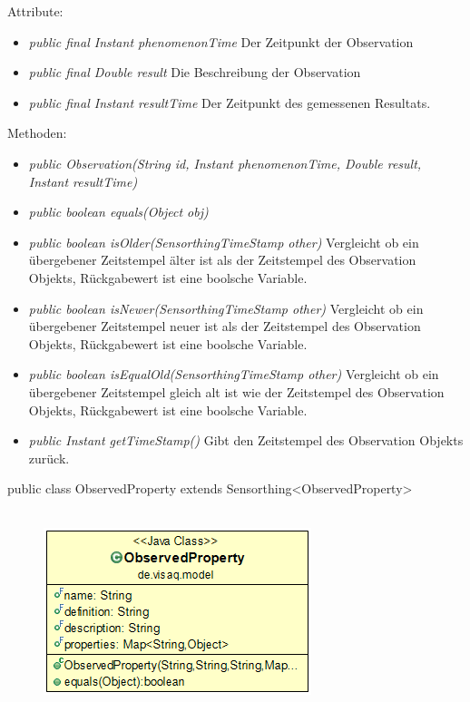 Attribute:
\begin{itemize} 
	\item \emph{public final Instant phenomenonTime} Der Zeitpunkt der Observation
	\item \emph{public final Double result} Die Beschreibung der Observation
	\item \emph{public final Instant resultTime} Der Zeitpunkt des gemessenen Resultats.
\end{itemize}
Methoden:
\begin{itemize} 
	\item \emph{public Observation(String id, Instant phenomenonTime, Double result, Instant resultTime)} 
	\item \emph{public boolean equals(Object obj)} 
	\item \emph{public boolean isOlder(SensorthingTimeStamp other)} Vergleicht ob ein übergebener Zeitstempel älter ist als der Zeitstempel des Observation Objekts, Rückgabewert ist eine boolsche Variable.
	\item \emph{public boolean isNewer(SensorthingTimeStamp other)} Vergleicht ob ein übergebener Zeitstempel neuer ist als der Zeitstempel des Observation Objekts, Rückgabewert ist eine boolsche Variable.
	\item \emph{public boolean isEqualOld(SensorthingTimeStamp other)} Vergleicht ob ein übergebener Zeitstempel gleich alt ist wie der Zeitstempel des Observation Objekts, Rückgabewert ist eine boolsche Variable.
	\item \emph{public Instant getTimeStamp()} Gibt den Zeitstempel des Observation Objekts zurück.
\end{itemize}


public class ObservedProperty extends Sensorthing<ObservedProperty>
\\\\
\begin{minipage}{0.3\textwidth}
	\begin{figure}[H]
		\includegraphics[scale = 0.5
		]{media/frontend/model/ObservedPropertyClass.png}
	\end{figure}
\end{minipage} \hfill
\begin{minipage}{0.6\textwidth}
\end{minipage}

